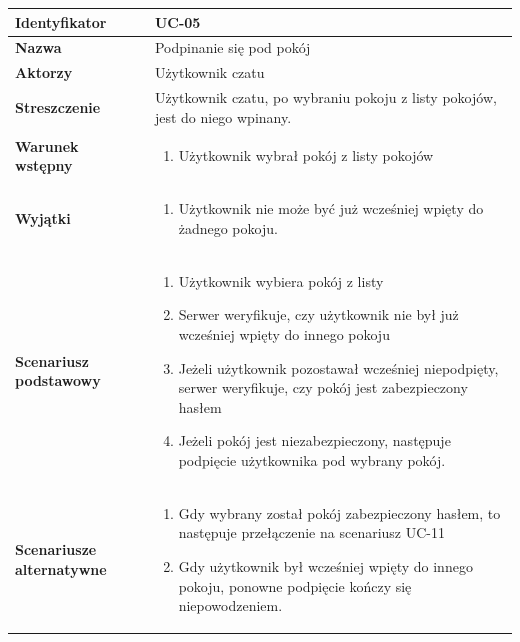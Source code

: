 \documentclass[11pt,oneside,a4paper,titlepage,onecolumn]{article}
\newenvironment{enumreq}
{ \begin{enumerate}[topsep=0pt,itemsep=-1ex,partopsep=1ex,parsep=1ex] }
{ \end{enumerate}                  }
\begin{document}
{\begin{tabular}{ | l | l | }
	\hline
		\textbf{Identyfikator} & 
		UC-05
		\\
		
	\hline
		\textbf{Nazwa} & 
		Podpinanie się pod pokój
		\\
		
	\hline
		\textbf{Aktorzy} & \parbox[t]{11cm}{
			Użytkownik czatu
		}\\
		 
	\hline
		\parbox[t]{4cm}{\textbf{Streszczenie}} & \parbox[t]{11cm}{
			Użytkownik czatu, po wybraniu pokoju z listy pokojów, jest
			do niego wpinany.
			
		}\\
		
	\hline
		\parbox[t]{4cm}{\textbf{Warunek wstępny}} & \parbox[t]{11cm}{
			\begin{enumreq}
				\item Użytkownik wybrał pokój z listy pokojów
			\end{enumreq}
				
		}
		\\
		
	\hline
		\parbox[t]{4cm}{\textbf{Wyjątki}} & \parbox[t]{11cm}{
			\begin{enumreq}
				\item Użytkownik nie może być już wcześniej wpięty
				do żadnego pokoju.
			\end{enumreq}
			
		}
		\\

	\hline
		\parbox[t]{4cm}{\textbf{Scenariusz podstawowy}} & \parbox[t]{11cm}{
			\begin{enumreq}
				\item Użytkownik wybiera pokój z listy
				\item Serwer weryfikuje, czy użytkownik nie był już
				wcześniej wpięty do innego pokoju
				\item Jeżeli użytkownik pozostawał wcześniej niepodpięty,
				serwer weryfikuje, czy pokój jest zabezpieczony hasłem
				\item Jeżeli pokój jest niezabezpieczony, następuje
				podpięcie użytkownika pod wybrany pokój.
			\end{enumreq}
		}
		\\
		
	\hline
		\parbox[t]{4cm}{\textbf{Scenariusze alternatywne}} & \parbox[t]
		{11cm}{
			\begin{enumreq}
				\item Gdy wybrany został pokój zabezpieczony hasłem,
				to następuje przełączenie na scenariusz UC-11
				\item Gdy użytkownik był wcześniej wpięty do innego pokoju,
				ponowne podpięcie kończy się niepowodzeniem.
			\end{enumreq}
		}
		\\
		

\end{tabular}}
\end{document}
